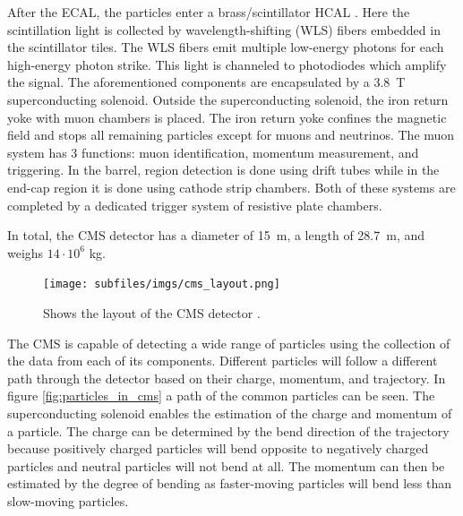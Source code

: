 After the ECAL, the particles enter a brass/scintillator HCAL \cite{collaboration2008cms}. Here the scintillation light is collected by wavelength-shifting (WLS) fibers embedded in the scintillator tiles. The WLS fibers emit multiple low-energy photons for each high-energy photon strike. This light is channeled to photodiodes which amplify the signal. The aforementioned components are encapsulated by a \SI{3.8}{T} superconducting solenoid. Outside the superconducting solenoid, the iron return yoke with muon chambers is placed. The iron return yoke confines the magnetic field and stops all remaining particles except for muons and neutrinos. The muon system has 3 functions: muon identification, momentum measurement, and triggering. In the barrel, region detection is done using drift tubes while in the end-cap region it is done using cathode strip chambers. Both of these systems are completed by a dedicated trigger system of resistive plate chambers.

In total, the CMS detector has a diameter of \SI{15}{m}, a length of \SI{28.7}{m}, and weighs $14 \cdot 10^6$ \si{kg}.

\begin{figure}[H]
    \centering
    \texttt{[image: subfiles/imgs/cms\_layout.png]}
    \caption{Shows the layout of the CMS detector \cite{CMSdetector}.}
    \label{fig:cms_layout}
\end{figure}

The CMS is capable of detecting a wide range of particles using the collection of the data from each of its components. Different particles will follow a different path through the detector based on their charge, momentum, and trajectory. In figure \ref{fig:particles_in_cms} a path of the common particles can be seen. The superconducting solenoid enables the estimation of the charge and momentum of a particle. The charge can be determined by the bend direction of the trajectory because positively charged particles will bend opposite to negatively charged particles and neutral particles will not bend at all. The momentum can then be estimated by the degree of bending as faster-moving particles will bend less than slow-moving particles. 

